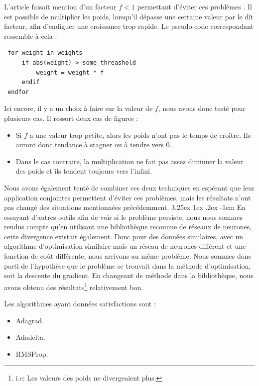 \documentclass[a4paper, 11pt]{article}
\makeatletter
\renewcommand\paragraph{\@startsection{paragraph}{5}{\z@}%
  {3.25ex \@plus1ex \@minus.2ex}%
  {-1em}%
  {\normalfont\normalsize\bfseries}}
\makeatother
\begin{document}
L'article faisait mention d'un facteur $f < 1$ permettant d'éviter ces problèmes \cite{fx_trading}. Il est possible de multiplier les poids, lorsqu'il 
dépasse une certaine valeur par le dît facteur, afin d'endiguer une croissance trop rapide. Le pseudo-code correspondant ressemble à cela :
\begin{lstlisting}
 for weight in weights
     if abs(weight) > some_threashold
         weight = weight * f
     endif
 endfor
\end{lstlisting}

Ici encore, il y a un choix à faire sur la valeur de $f$, nous avons donc testé pour plusieurs cas. Il ressort deux cas de figures :
\begin{itemize}
 \item Si $f$ a une valeur trop petite, alors les poids n'ont pas le temps de croître. Ils auront donc tendance à stagner ou à tendre vers $0$.
 \item Dans le cas contraire, la multiplication ne fait pas assez diminuer la valeur des poids et ils tendent toujours vers l'infini.
\end{itemize}

Nous avons également tenté de combiner ces deux techniques en espérant que leur application conjointes permettent d'éviter ces problèmes, mais les
résultats n'ont pas changé des situations mentionnées précédemment.
\paragraph{}
En essayant d'autres outils afin de voir si le problème persiste, nous nous sommes rendus compte qu'en utilisant une bibliothèque reconnue de réseaux de 
neurones\cite{keras}, cette divergence existait également. Donc pour des données similaires, avec un algorithme d'optimisation similaire mais un réseau de neurones
différent et une fonction de coût différente, nous arrivons au même problème.
Nous sommes donc parti de l'hypothèse que le problème se trouvait dans la méthode d'optimisation, soit la descente du gradient. En changeant de méthode
dans la bibliothèque, nous avons obtenu des résultats\footnote{i.e: Les valeurs des poids ne divergeaient plus.} relativement bon.

Les algorithmes ayant données satisfactions sont \cite{keras}:
\begin{itemize}
 \item Adagrad.
 \item Adadelta.
 \item RMSProp.
\end{itemize}
\end{document}
